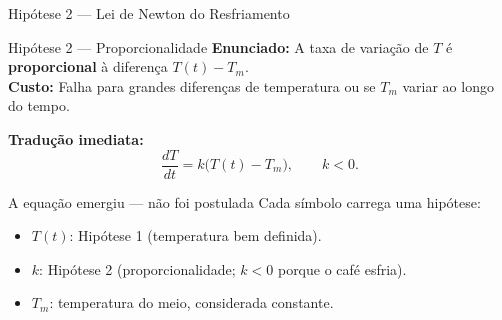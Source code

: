 \documentclass[12pt]{beamer}
\newcommand{\hipotese}[4]{%
  \begin{block}{Hipótese #1 — #2}
    \textbf{Enunciado:} #3\\[4pt]
    \textbf{Custo:} #4
  \end{block}%
}
\begin{document}
\begin{frame}{Hipótese 2 — Lei de Newton do Resfriamento}

  \hipotese{2}{Proporcionalidade}{%
    A taxa de variação de $T$ é \textbf{proporcional}
    à diferença $T(t) - T_m$.%
  }{%
    Falha para grandes diferenças de temperatura
    ou se $T_m$ variar ao longo do tempo.%
  }

  \vspace{10pt}
  \pause

  \textbf{Tradução imediata:}
  \[
    \frac{dT}{dt} = k\bigl(T(t) - T_m\bigr), \qquad k < 0.
  \]

  \vspace{6pt}
  \pause

  \begin{exampleblock}{A equação emergiu — não foi postulada}
    Cada símbolo carrega uma hipótese:
    \begin{itemize}
      \item $T(t)$: Hipótese 1 (temperatura bem definida).
      \item $k$: Hipótese 2 (proporcionalidade; $k<0$ porque o café esfria).
      \item $T_m$: temperatura do meio, considerada constante.
    \end{itemize}
  \end{exampleblock}

\end{frame}

\end{document}

